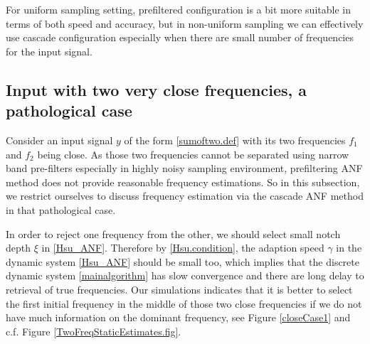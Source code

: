 \documentclass{UCF_ETD}
\begin{document}
For uniform sampling setting, prefiltered configuration is a bit more suitable in terms of both speed and accuracy, but in non-uniform sampling we can effectively use cascade configuration
especially when  there are small number of frequencies for the input signal.



\subsection{Input with two very close frequencies, a pathological case}
\label{tcf.subsection}

Consider an input signal $y$ of the form \eqref{sumoftwo.def}
with its two  frequencies $f_1$ and $f_2$ being close.
As those two  frequencies  cannot be separated using narrow band pre-filters especially in highly noisy   sampling environment, prefiltering ANF method does not provide reasonable frequency estimations.
So in this subsection, we  restrict ourselves  to discuss frequency estimation via  the cascade ANF method in that
 pathological case. %

 In order to reject one frequency from the other,
 we should select small notch depth $\xi$ in \eqref{Hsu_ANF}.
Therefore by \eqref{Hsu.condition},
 the adaption speed $\gamma$ in the dynamic system \eqref{Hsu_ANF} should be small  too,
 which implies that the discrete dynamic system \eqref{mainalgorithm} has
  slow convergence and there are long delay to retrieval of  true frequencies.
  Our simulations indicates that it is better to select the first initial frequency
  in the middle of those two close frequencies if we do not have much information on the dominant frequency,
  see Figure  \ref{closeCase1} and c.f. Figure \ref{TwoFreqStaticEstimates.fig}.
\end{document}
